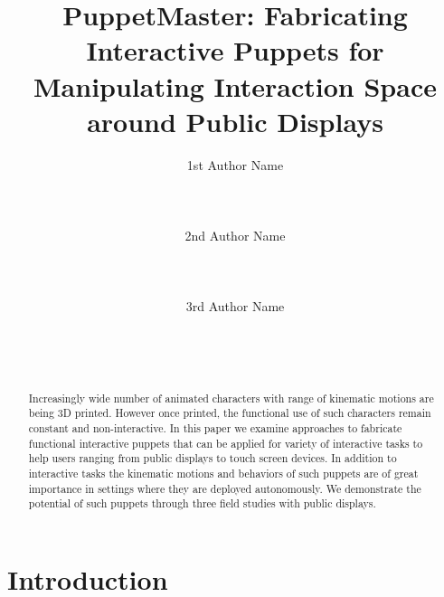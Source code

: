 \documentclass{sigchi}
\begin{document}
\title{PuppetMaster: Fabricating Interactive Puppets for Manipulating Interaction Space around Public Displays}

\author{
  \alignauthor 1st Author Name\\
    \\
    \\
    \\
  \alignauthor 2nd Author Name\\
    \\
    \\
    \\
  \alignauthor 3rd Author Name\\
    \\
    \\
    \\
}

\maketitle

\begin{abstract}

Increasingly wide number of animated characters with range of kinematic motions are being 3D printed. However once printed, the functional use of such characters remain constant and non-interactive. In this paper we examine approaches to fabricate functional interactive puppets that can be applied for variety of interactive tasks to help users ranging from public displays to touch screen devices. In addition to interactive tasks the kinematic motions and behaviors of such puppets are of great importance in settings where they are deployed autonomously. We demonstrate the potential of such puppets through three field studies with public displays. 

\end{abstract}



\section{Introduction}
\end{document}
